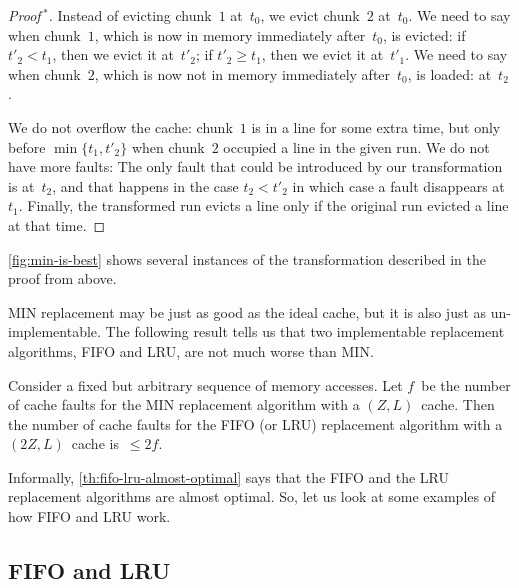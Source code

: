 \begin{proof}[Proof$\,{}^\ast$]
Instead of evicting chunk~$1$ at~$t_0$, we evict chunk~$2$ at~$t_0$.
We need to say when chunk~$1$,
  which is now in memory immediately after~$t_0$,
is evicted:
  if $t'_2<t_1$, then we evict it at~$t'_2$;
  if $t'_2\ge t_1$, then we evict it at~$t'_1$.
We need to say when chunk~$2$,
  which is now not in memory immediately after~$t_0$,
is loaded:
  at~$t_2$.

We do not overflow the cache:
  chunk~$1$ is in a line for some extra time,
  but only before $\min\{t_1,t'_2\}$ when chunk~$2$ occupied a line in the given run.
We do not have more faults:
  The only fault that could be introduced by our transformation is at~$t_2$,
  and that happens in the case $t_2<t'_2$ in which case a fault disappears at~$t_1$.
Finally, the transformed run evicts a line only if the original run evicted a line
  at that time.
\end{proof}
\autoref{fig:min-is-best} shows several instances of the transformation described
  in the proof from above.

MIN replacement may be just as good as the ideal cache,
  but it is also just as un-implementable.
The following result tells us that two implementable replacement algorithms,
  FIFO and LRU, are not much worse than MIN\null.
\begin{theorem}\label{th:fifo-lru-almost-optimal}
Consider a fixed but arbitrary sequence of memory accesses.
Let $f$~be the number of cache faults for the MIN replacement algorithm
  with a $(Z,L)$~cache.
Then the number of cache faults for the FIFO (or LRU) replacement algorithm with a $(2Z,L)$~cache
  is~$\le2f$.
\end{theorem}

Informally, \autoref{th:fifo-lru-almost-optimal}
  says that the FIFO and the LRU replacement algorithms are almost optimal.
So, let us look at some examples of how FIFO and LRU work.

\subsection*{FIFO and LRU}

